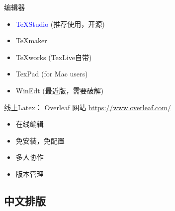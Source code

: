 \documentclass[13pt]{ctexbeamer}
\newcommand{\blue}[1]{\textcolor{blue}{#1}}
\begin{document}
\begin{frame}{编辑器}
\begin{itemize}
\item  \blue{TeXStudio} (推荐使用，开源)
\item TeXmaker
\item TeXworks (TexLive自带)
\item TexPad (for Mac users)
\item WinEdt (最近版，需要破解)
\end{itemize}
\end{frame}






\begin{frame}{线上Latex：  Overleaf}
网站 
\href{https://www.overleaf.com/
}{https://www.overleaf.com/
}
\begin{itemize}
\item 在线编辑

\item 免安装，免配置

\item 多人协作

\item 版本管理
\end{itemize}
\end{frame}


  
\subsection{中文排版}

%
%
%    
\end{document}
